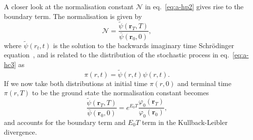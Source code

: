 A closer look at the normalisation constant $\mathcal{N}$ in eq.~\eqref{eq:a-hp2} gives rise to the boundary term. The normalisation is given by
\begin{equation}
	\mathcal N = \frac{\tilde{\psi}\left(\boldsymbol{r}_{T}, T\right)}{\bar{\psi}\left(\boldsymbol{r}_{0}, 0\right)},
\end{equation}
where $\tilde{\psi}\left(r_{t}, t\right)$ is the solution to the backwards imaginary time Schr\" odinger equation~\cite{barr2020quantum}, and is related to the distribution of the stochastic process in eq.~\eqref{eq:a-hc3} as
\begin{equation}
	\pi(r, t) = \tilde{\psi}\left(r, t\right) \psi\left(r, t\right).
\end{equation}
If we now take both distributions at initial time $\pi(r, 0)$ and terminal time $\pi(r, T)$ to be the ground state the normalisation constant becomes
\begin{equation}
	\frac{\tilde{\psi}\left(\boldsymbol{r}_{T}, T\right)}{\bar{\psi}\left(\boldsymbol{r}_{0}, 0\right)} = e^{E_{0} T} \frac{\varphi_{0}\left(\boldsymbol{r}_{T}\right)}{\varphi_{0}\left(\boldsymbol{r}_{0}\right)},
\end{equation}
and accounts for the boundary term and $E_0 T$ term in the Kullback-Leibler divergence.

